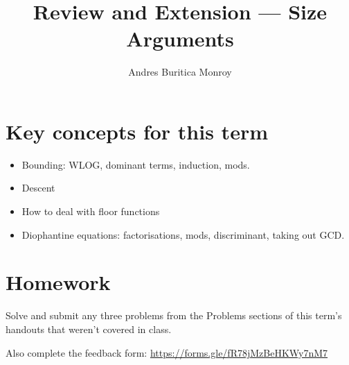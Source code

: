 \documentclass{article}
\title{Review and Extension --- Size Arguments}
\author{Andres Buritica Monroy}
\date{}
\begin{document}
\maketitle
\section{Key concepts for this term}
\begin{itemize}
	\item Bounding: WLOG, dominant terms, induction, mods.
	\item Descent
	\item How to deal with floor functions
	\item Diophantine equations: factorisations, mods, discriminant, taking out
	      GCD\@.
\end{itemize}
\section{Homework}
Solve and submit any three problems from the Problems sections of this
term's handouts that weren't covered in class.

Also complete the feedback form:
\url{https://forms.gle/fR78jMzBeHKWy7nM7}
\end{document}
